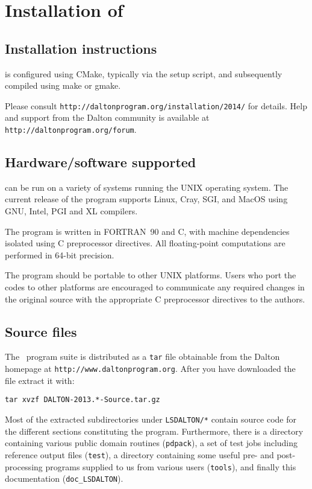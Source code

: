 \chapter{Installation of \lsdalton}\label{ch:install}

\section{Installation instructions}

{\lsdalton} is configured using CMake, typically via the setup script,
and subsequently compiled using make or gmake.

Please consult \verb|http://daltonprogram.org/installation/2014/| for details.
Help and support from the Dalton community is available at \verb|http://daltonprogram.org/forum|.

\section{Hardware/software supported}
{\lsdalton} can be run on a variety of systems running the UNIX operating system.
The current release of the program supports Linux, Cray, SGI,
and MacOS using GNU, Intel, PGI and XL compilers.

The program is written in FORTRAN~90 and C, with machine dependencies
isolated using C preprocessor directives.  All
floating-point computations are performed in 64-bit precision.

The program should be portable to other UNIX platforms.  Users
who port the codes to other platforms are encouraged to communicate any
required changes in the original source with the appropriate C preprocessor
directives to the authors.

\section{Source files}\label{sec:source}

The \latestrelease\ program suite is distributed as a \verb|tar|
file obtainable from
the Dalton homepage at \verb|http://www.daltonprogram.org|.
After you have downloaded the file extract it with:
\begin{verbatim}
tar xvzf DALTON-2013.*-Source.tar.gz
\end{verbatim}
Most of the extracted subdirectories under \verb|LSDALTON/*| contain source code for the different
sections constituting the {\lsdalton} program.
Furthermore, there is a directory containing various public domain routines (\verb|pdpack|), a set of test jobs including reference output files (\verb|test|), a directory
containing some useful pre- and post-processing programs supplied to us from
various users (\verb|tools|), and finally this documentation (\verb|doc_LSDALTON|). 

